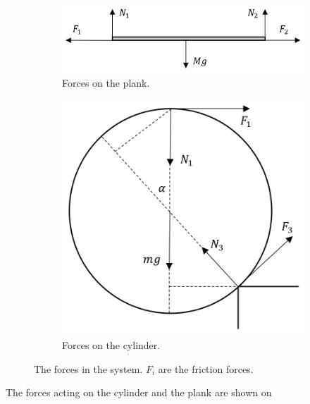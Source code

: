 \begin{figure}
    \centering

    \begin{subfigure}[l]{.5\textwidth}
        \centering
        \includegraphics[width = \textwidth]{S-1}
        \caption{Forces on the plank.}
    \end{subfigure}
    \hfill
    \begin{subfigure}[l]{.5\textwidth}
        \centering
        \includegraphics[width = \textwidth]{S-2}
        \caption{Forces on the cylinder.}
    \end{subfigure}
    
    \caption{The forces in the system. $F_i$ are the friction forces.}
    \vspace{-4cm}
\end{figure}

The forces acting on the cylinder and the plank are shown on 

